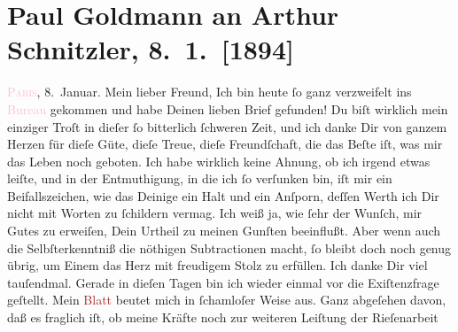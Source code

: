 

               \section[Paul Goldmann an Arthur Schnitzler, 8. 1. {[}1894{]}]{ Paul Goldmann an Arthur Schnitzler, 8. 1. {[}1894{]}}\nopagebreak{}\rehead{ }\normalsize\beginnumbering{} \toendnotes[C]{\smallbreak\pagebreak[2]} 
\toendnotes[C]{\smallbreak}\pstart
           \raggedleft{}{\pb}\textsc{\textcolor{pink}{Paris}{}\ledrightnote{\textcolor{pink}{Paris}},}{ }8. Januar.\pend
           \pstart\center{}Mein lieber Freund,\pend\pstart
           Ich bin heute ſo ganz verzweifelt ins \textcolor{pink}{Bureau}{} gekommen und habe Deinen lieben Brief gefunden! Du
               biſt wirklich mein einziger Troſt in dieſer ſo bitterlich ſchweren Zeit, und ich
               danke Dir von ganzem Herzen für dieſe Güte, dieſe Treue, dieſe Freundſchaft, die das
               Beſte iſt, was mir das Leben noch geboten. Ich habe wirklich keine Ahnung, ob ich
               irgend etwas leiſte, und in der Entmuthigung, in die ich ſo verſunken bin, iſt mir
                  ein\strikeout{\textcolor{gray}{e}} Beifallszeichen, wie das Deinige ein Halt und {\pb}ein Anſporn, deſſen Werth ich Dir nicht mit Worten zu ſchildern vermag. Ich weiß
               ja, wie ſehr der Wunſch, mir Gutes zu erweiſen, Dein Urtheil zu meinen Gunſten
               beeinflußt. Aber wenn auch die Selbſterkenntniß die nöthigen Subtractionen macht, ſo
               bleibt doch noch genug übrig, um Einem das Herz mit freudigem Stolz zu erfüllen. Ich
               danke Dir viel tauſendmal.\pend
           \pstart
           Gerade in dieſen Tagen bin ich wieder einmal vor die Exiſtenzfrage geſtellt. Mein \textcolor{brown}{Blatt}{} beutet mich {\pb}in ſchamloſer Weise aus. Ganz abgeſehen davon, daß
               es fraglich iſt, ob meine Kräfte noch zur weiteren Leiſtung der Rieſenarbeit
